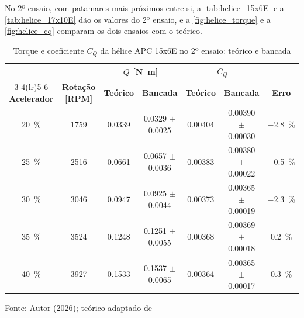 No 2º ensaio, com patamares mais próximos entre si, a \autoref{tab:helice_15x6E} e a
\autoref{tab:helice_17x10E} dão os valores do 2º ensaio, e a
\autoref{fig:helice_torque} e a \autoref{fig:helice_cq} comparam os dois
ensaios com o teórico.

\begin{table}[H]
    \centering
    \caption{Torque e coeficiente $C_Q$ da hélice APC 15x6E no 2º ensaio: teórico e bancada}
    \label{tab:helice_15x6E}
    \small
    \setlength{\tabcolsep}{4pt}
    \begin{tabular}{ccccccc}
        \toprule
        & & \multicolumn{2}{c}{\textbf{$Q$ [\si{\newton\meter}]}} & \multicolumn{2}{c}{\textbf{$C_Q$}} & \\
        \cmidrule(lr){3-4}\cmidrule(lr){5-6}
        \textbf{Acelerador} & \textbf{Rotação [RPM]} & \textbf{Teórico} & \textbf{Bancada} & \textbf{Teórico} & \textbf{Bancada} & \textbf{Erro} \\
        \midrule
        \SI{20}{\percent} & \num{1759} & \num{0,0339} & \num{0,0329} $\pm$ \num{0,0025} & \num{0,00404} & \num{0,00390} $\pm$ \num{0,00030} & \SI{-2,8}{\percent} \\
        \SI{25}{\percent} & \num{2516} & \num{0,0661} & \num{0,0657} $\pm$ \num{0,0036} & \num{0,00383} & \num{0,00380} $\pm$ \num{0,00022} & \SI{-0,5}{\percent} \\
        \SI{30}{\percent} & \num{3046} & \num{0,0947} & \num{0,0925} $\pm$ \num{0,0044} & \num{0,00373} & \num{0,00365} $\pm$ \num{0,00019} & \SI{-2,3}{\percent} \\
        \SI{35}{\percent} & \num{3524} & \num{0,1248} & \num{0,1251} $\pm$ \num{0,0055} & \num{0,00368} & \num{0,00369} $\pm$ \num{0,00018} & \SI{+0,2}{\percent} \\
        \SI{40}{\percent} & \num{3927} & \num{0,1533} & \num{0,1537} $\pm$ \num{0,0065} & \num{0,00364} & \num{0,00365} $\pm$ \num{0,00017} & \SI{+0,3}{\percent} \\
        \bottomrule
    \end{tabular}

    \vspace{2pt}
    {\small Fonte: Autor (2026); teórico adaptado de }
\end{table}

